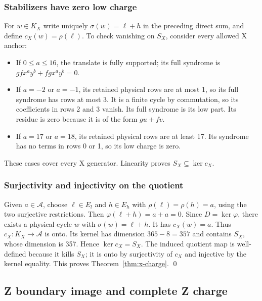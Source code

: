 \documentclass{article}
\begin{document}
\subsubsection{Stabilizers have zero low charge}\label{app:x-stabilizers}

For \(w \in K_X\) write uniquely \(\sigma(w) = \ell + h\) in the preceding
direct sum, and define \(c_X(w) = \rho(\ell)\).
To check vanishing on \(S_X\), consider every allowed X anchor:

\begin{itemize}
  \item If \(0 \le a \le 16\), the translate is fully supported; its full syndrome is
    \(gf x^a y^b + fg x^a y^b = 0\).
  \item If \(a = -2\) or \(a = -1\), its retained physical rows are at most 1, so
    its full syndrome has rows at most 3. It is a finite cycle by
    commutation, so its coefficients in rows 2 and 3 vanish.
    Its full syndrome is its low part. Its residue is zero because it is
    of the form \(gu + fv\).
  \item If \(a = 17\) or \(a = 18\), its retained physical rows are at least 17.
    Its syndrome has no terms in rows 0 or 1, so its low charge is zero.
\end{itemize}

These cases cover every X generator. Linearity proves
\(S_X \subseteq \ker c_X\).

\subsubsection{Surjectivity and injectivity on the quotient}\label{app:x-quotient}

Given \(a \in \mathcal{A}\), choose \(\ell \in E_l\) and \(h \in E_h\) with
\(\rho(\ell) = \rho(h) = a\), using the two surjective restrictions.
Then \(\varphi(\ell + h) = a + a = 0\). Since \(D = \ker \varphi\), there exists a physical
cycle \(w\) with \(\sigma(w) = \ell + h\). It has \(c_X(w) = a\).
Thus \(c_X \colon K_X \to \mathcal{A}\) is onto.
Its kernel has dimension \(365 - 8 = 357\) and contains \(S_X\), whose
dimension is 357. Hence \(\ker c_X = S_X\).
The induced quotient map is well-defined because it kills \(S_X\);
it is onto by surjectivity of \(c_X\) and injective by the kernel equality.
This proves Theorem~\ref{thm:x-charge}. \qed

\subsection{Z boundary image and complete Z charge}\label{app:z-charge}
\end{document}
